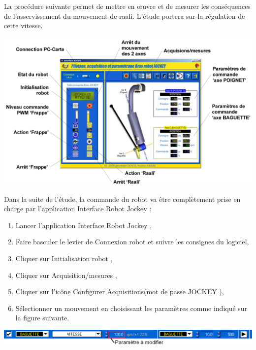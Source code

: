 

\ifdef{\public}{\cleardoublepage}{\newpage}



La procédure suivante permet de mettre en \oe uvre et de mesurer les conséquences de l'asservissement du mouvement de raali.
L'étude portera sur la régulation de cette vitesse.

\begin{center}
 \includegraphics[width=0.8\linewidth]{img/img1}
\end{center}

Dans la suite de l'étude, la commande du robot va être complètement prise en charge par l'application \og Interface Robot Jockey \fg:
\begin{enumerate}
 \item Lancer l'application \og Interface Robot Jockey \fg,
 \item Faire basculer le levier de \og Connexion robot \fg et suivre les consignes du logiciel,
 \item Cliquer sur \og Initialisation robot \fg,
 \item Cliquer sur \og Acquisition/mesures \fg,
 \item Cliquer sur l'icône \og Configurer Acquisitions\fg (mot de passe \og JOCKEY \fg),
 \item Sélectionner un mouvement en choisissant les paramètres comme indiqué sur la figure suivante.
\end{enumerate} 

\begin{center}
 \includegraphics[width=0.9\linewidth]{img/img2}
\end{center}

